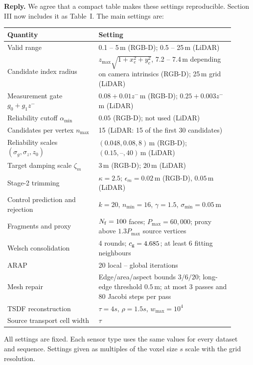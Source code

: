 \documentclass[11pt,a4paper]{article}
\newenvironment{reply}{\begingroup\color{replyblue}\textbf{Reply.} }{\par\endgroup}
\begin{document}
\begin{reply}
We agree that a compact table makes these settings reproducible. Section III now includes it as Table~I. The main settings are:
\begin{center}\small
\begin{tabular}{p{0.37\linewidth}p{0.55\linewidth}}\toprule
Quantity & Setting\\\midrule
Valid range & 0.1 -- 5\,m (RGB-D); 0.5 -- 25\,m (LiDAR)\\
Candidate index radius & $z_{\max}\sqrt{1+x_e^2+y_e^2}$, 7.2 -- 7.4\,m depending on camera intrinsics (RGB-D); 25\,m grid (LiDAR)\\
Measurement gate $g_0+g_1z^-$ & $0.08+0.01z^-$\,m (RGB-D); $0.25+0.003z^-$\,m (LiDAR)\\
Reliability cutoff $\alpha_{\min}$ & $0.05$ (RGB-D); not used (LiDAR)\\
Candidates per vertex $n_{\max}$ & 15 (LiDAR: 15 of the first 30 candidates)\\
Reliability scales $(\sigma_g,\sigma_z,z_0)$ & $(0.048,0.08,8)$\,m (RGB-D); $(0.15,\text{--},40)$\,m (LiDAR)\\
Target damping scale $\zeta_m$ & $3$\,m (RGB-D); $20$\,m (LiDAR)\\
Stage-2 trimming & $\kappa=2.5$; $\epsilon_m=0.02$\,m (RGB-D), $0.05$\,m (LiDAR)\\
Control prediction and rejection & $k=20$, $n_{\min}=16$, $\gamma=1.5$, $\sigma_{\min}=0.05$\,m\\
Fragments and proxy & $N_{\rm f}=100$ faces; $P_{\max}=60{,}000$; proxy above $1.3P_{\max}$ source vertices\\
Welsch consolidation & 4 rounds; $c_{\rm g}=4.685$; at least 6 fitting neighbours\\
ARAP & 20 local -- global iterations\\
Mesh repair & Edge/area/aspect bounds $3/6/20$; long-edge threshold $0.5$\,m; at most 3 passes and 80 Jacobi steps per pass\\
TSDF reconstruction & $\tau=4s$, $\rho=1.5s$, $w_{\max}=10^4$\\
Source transport cell width & $\tau$\\\bottomrule
\end{tabular}
\end{center}
All settings are fixed. Each sensor type uses the same values for every dataset and sequence. Settings given as multiples of the voxel size $s$ scale with the grid resolution.


\end{reply}
\end{document}
